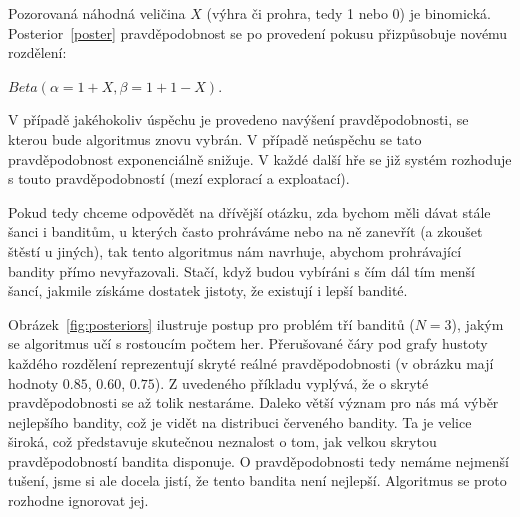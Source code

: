 \documentclass[thesis=M,czech]{FITthesis}[2014/05/07]
\begin{document}
Pozorovaná náhodná veličina $X$ (výhra či prohra, tedy 1 nebo 0) je binomická. Posterior~\ref{poster} pravděpodobnost se po provedení pokusu přizpůsobuje novému rozdělení:

\begin{center}
${Beta}(\alpha = 1 + X, \beta = 1 + 1 - X)$.
\end{center}

V případě jakéhokoliv úspěchu je provedeno navýšení pravděpodobnosti, se kterou bude algoritmus znovu vybrán. V případě neúspěchu se tato pravděpodobnost exponenciálně snižuje. V každé další hře se již systém rozhoduje s touto pravděpodobností (mezí explorací a exploatací).

Pokud tedy chceme odpovědět na dřívější otázku, zda bychom měli dávat stále šanci i banditům, u kterých často prohráváme nebo na ně zanevřít (a zkoušet štěstí u jiných), tak tento algoritmus nám navrhuje, abychom prohrávající bandity přímo nevyřazovali. Stačí, když budou vybíráni s čím dál tím menší šancí, jakmile získáme dostatek jistoty, že existují i lepší bandité. 

Obrázek~\ref{fig:posteriors} ilustruje postup pro problém tří banditů ($N = 3$), jakým se algoritmus učí s rostoucím počtem her. Přerušované čáry pod grafy hustoty každého rozdělení reprezentují skryté reálné pravděpodobnosti (v obrázku mají hodnoty $0.85$, $0.60$, $0.75$). Z uvedeného příkladu vyplývá, že o skryté pravděpodobnosti se až tolik nestaráme. Daleko větší význam pro nás má výběr nejlepšího bandity, což je vidět na distribuci červeného bandity. Ta je velice široká, což představuje skutečnou neznalost o tom, jak velkou skrytou pravděpodobností bandita disponuje. O pravděpodobnosti tedy nemáme nejmenší tušení, jsme si ale docela jistí, že tento bandita není nejlepší. Algoritmus se proto rozhodne ignorovat jej.
\end{document}
